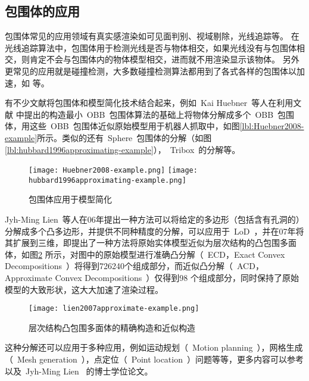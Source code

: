 \subsection{包围体的应用}

包围体常见的应用领域有真实感渲染如可见面判别、视域剔除\cite{assarsson2000optimized}，光线追踪\cite{wald2007ray}等。
在光线追踪算法中，包围体用于检测光线是否与物体相交，如果光线没有与包围体相交，则肯定不会与包围体内的物体模型相交，进而就不用渲染显示该物体。
另外更常见的应用就是碰撞检测\cite{wangzhiqiang1999}，大多数碰撞检测算法都用到了各式各样的包围体以加速，如
\cite{larsson2006dynamic,madera2009hybrid,vogiannou2010enhancing,chang2010efficient,tang2010fast,zhigang2010efficient} 等。

有不少文献将包围体和模型简化技术结合起来，例如~Kai Huebner~等人\cite{huebner2008minimum}在利用文献
中提出的构造最小~OBB~包围体算法的基础上将物体分解成多个~OBB~包围体，用这些~OBB~包围体近似原始模型用于机器人抓取中，如图\ref{lbl:Huebner2008-example}所示。类似的还有~Sphere~包围体的分解\cite{hubbard1996approximating}（如图\ref{lbl:hubbard1996approximating-example}），~Tribox~的分解\cite{crosnier1999tribox}等。

\begin{figure}[H]
  \centering
    {\texttt{[image: Huebner2008-example.png]}}
    {\texttt{[image: hubbard1996approximating-example.png]}}
  \caption{包围体应用于模型简化}
  \label{lbl:bounding-voluems-used-in-shape-approximation}
\end{figure}

Jyh-Ming Lien~\cite{lien2006approximate2d}等人在06年提出一种方法可以将给定的多边形（包括含有孔洞的）分解成多个凸多边形，并提供不同种精度的分解，可以应用于~LoD~，并在07年将其扩展到三维\cite{lien2007approximate3d}，即提出了一种方法将原始实体模型近似为层次结构的凸包围多面体，如图\ref{lbl:lien2007approximate-example} 所示，对图中的原始模型进行准确凸分解（~ECD，Exact Convex Decompositions~）将得到726240个组成部分，而近似凸分解（~ACD，Approximate Convex Decompositions~）仅得到98 个组成部分，同时保持了原始模型的大致形状，这大大加速了渲染过程。
\begin{figure}[H]
\centering
\texttt{[image: lien2007approximate-example.png]}
\caption{层次结构凸包围多面体的精确构造和近似构造\cite{lien2007approximate3d}}
\label{lbl:lien2007approximate-example}
\end{figure}
这种分解还可以应用于多种应用，例如运动规划（~Motion planning~），网格生成（~Mesh generation~），点定位（~Point location~）问题等等，更多内容可以参考\cite{lien2008approximate} 以及~Jyh-Ming Lien~ 的博士学位论文\cite{lien2006approximatephd}。

